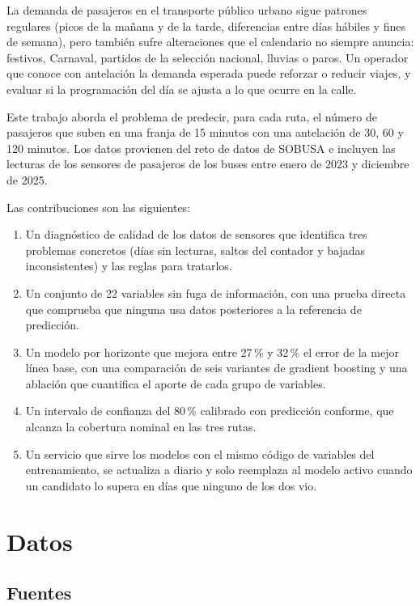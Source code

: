 \documentclass[11pt,a4paper]{article}
\begin{document}
La demanda de pasajeros en el transporte público urbano sigue patrones regulares (picos de la mañana y de la tarde, diferencias entre días hábiles y fines de semana), pero también sufre alteraciones que el calendario no siempre anuncia: festivos, Carnaval, partidos de la selección nacional, lluvias o paros. Un operador que conoce con antelación la demanda esperada puede reforzar o reducir viajes, y evaluar si la programación del día se ajusta a lo que ocurre en la calle.

Este trabajo aborda el problema de predecir, para cada ruta, el número de pasajeros que suben en una franja de 15 minutos con una antelación de 30, 60 y 120 minutos. Los datos provienen del reto de datos de SOBUSA e incluyen las lecturas de los sensores de pasajeros de los buses entre enero de 2023 y diciembre de 2025.

Las contribuciones son las siguientes:
\begin{enumerate}
  \item Un diagnóstico de calidad de los datos de sensores que identifica tres problemas concretos (días sin lecturas, saltos del contador y bajadas inconsistentes) y las reglas para tratarlos.
  \item Un conjunto de 22 variables sin fuga de información, con una prueba directa que comprueba que ninguna usa datos posteriores a la referencia de predicción.
  \item Un modelo por horizonte que mejora entre 27\,\% y 32\,\% el error de la mejor línea base, con una comparación de seis variantes de gradient boosting y una ablación que cuantifica el aporte de cada grupo de variables.
  \item Un intervalo de confianza del 80\,\% calibrado con predicción conforme, que alcanza la cobertura nominal en las tres rutas.
  \item Un servicio que sirve los modelos con el mismo código de variables del entrenamiento, se actualiza a diario y solo reemplaza al modelo activo cuando un candidato lo supera en días que ninguno de los dos vio.
\end{enumerate}

\section{Datos}

\subsection{Fuentes}
\end{document}

